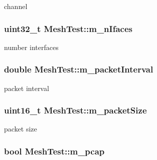 channel 

\subsubsection[{\texorpdfstring{m\+\_\+n\+Ifaces}{m_nIfaces}}]{\setlength{\rightskip}{0pt plus 5cm}uint32\+\_\+t Mesh\+Test\+::m\+\_\+n\+Ifaces\hspace{0.3cm}{\ttfamily [private]}}\hypertarget{classMeshTest_a3dee1b5f3e465791fcd96e215601b1e9}{}\label{classMeshTest_a3dee1b5f3e465791fcd96e215601b1e9}


number interfaces 

\subsubsection[{\texorpdfstring{m\+\_\+packet\+Interval}{m_packetInterval}}]{\setlength{\rightskip}{0pt plus 5cm}double Mesh\+Test\+::m\+\_\+packet\+Interval\hspace{0.3cm}{\ttfamily [private]}}\hypertarget{classMeshTest_aaa572b5f2eb6a2355a002616cdf4990e}{}\label{classMeshTest_aaa572b5f2eb6a2355a002616cdf4990e}


packet interval 

\subsubsection[{\texorpdfstring{m\+\_\+packet\+Size}{m_packetSize}}]{\setlength{\rightskip}{0pt plus 5cm}uint16\+\_\+t Mesh\+Test\+::m\+\_\+packet\+Size\hspace{0.3cm}{\ttfamily [private]}}\hypertarget{classMeshTest_a6a25f074e877610164e37f0c1f566dee}{}\label{classMeshTest_a6a25f074e877610164e37f0c1f566dee}


packet size 

\subsubsection[{\texorpdfstring{m\+\_\+pcap}{m_pcap}}]{\setlength{\rightskip}{0pt plus 5cm}bool Mesh\+Test\+::m\+\_\+pcap\hspace{0.3cm}{\ttfamily [private]}}\hypertarget{classMeshTest_a2bafad3263f4c6d2f72d0340699d4cc3}{}\label{classMeshTest_a2bafad3263f4c6d2f72d0340699d4cc3}


